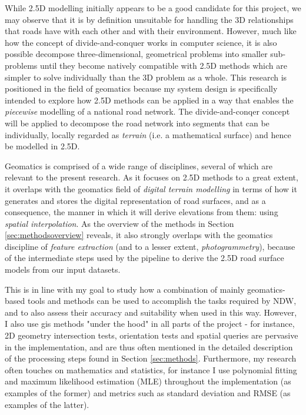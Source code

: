 While 2.5D modelling initially appears to be a good candidate for this project, we may observe that it is by definition unsuitable for handling the 3D relationships that roads have with each other and with their environment. However, much like how the concept of divide-and-conquer works in computer science, it is also possible decompose three-dimensional, geometrical problems into smaller sub-problems until they become natively compatible with 2.5D methods which are simpler to solve individually than the 3D problem as a whole. This research is positioned in the field of geomatics because my system design is specifically intended to explore how 2.5D methods can be applied in a way that enables the \textit{piecewise} modelling of a national road network. The divide-and-conqer concept will be applied to decompose the road network into segments that can be individually, locally regarded as \textit{terrain} (i.e. a mathematical surface) and hence be modelled in 2.5D.

Geomatics is comprised of a wide range of disciplines, several of which are relevant to the present research. As it focuses on 2.5D methods to a great extent, it overlaps with the geomatics field of \textit{digital terrain modelling} in terms of how it generates and stores the digital representation of road surfaces, and as a consequence, the manner in which it will derive elevations from them: using \textit{spatial interpolation}. As the overview of the methods in Section \ref{sec:methodsoverview} reveals, it also strongly overlaps with the geomatics discipline of \textit{feature extraction} (and to a lesser extent, \textit{photogrammetry}), because of the intermediate steps used by the pipeline to derive the 2.5D road surface models from our input datasets.

This is in line with my goal to study how a combination of mainly geomatics-based tools and methods can be used to accomplish the tasks required by NDW, and to also assess their accuracy and suitability when used in this way. However, I also use \ac{gis} methods "under the hood" in all parts of the project - for instance, 2D geometry intersection tests, orientation tests and spatial queries are pervasive in the implementation, and are thus often mentioned in the detailed description of the processing steps found in Section \ref{sec:methods}. Furthermore, my research often touches on mathematics and statistics, for instance I use polynomial fitting and maximum likelihood estimation (MLE) throughout the implementation (as examples of the former) and metrics such as standard deviation and RMSE (as examples of the latter).

